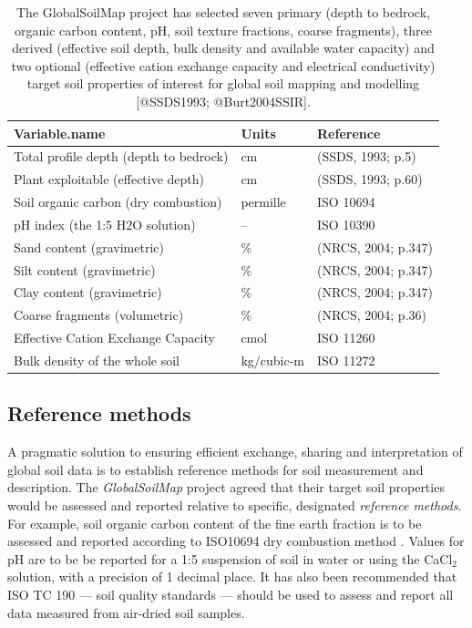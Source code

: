\documentclass[graybox,natbib,nospthms,UStrade]{svmono}
\begin{document}
\begin{table}[t]

\caption{\label{tab:globalsoilmap}The GlobalSoilMap project has selected seven primary (depth to bedrock, organic carbon content, pH, soil texture fractions, coarse fragments), three derived (effective soil depth, bulk density and available water capacity) and two optional (effective cation exchange capacity and electrical conductivity) target soil properties of interest for global soil mapping and modelling [@SSDS1993; @Burt2004SSIR].}
\centering
\begin{tabular}{lll}
\toprule
Variable.name & Units & Reference\\
\midrule
Total profile depth (depth to bedrock) & cm & (SSDS, 1993; p.5)\\
Plant exploitable (effective depth) & cm & (SSDS, 1993; p.60)\\
Soil organic carbon (dry combustion) & permille & ISO 10694\\
pH index (the 1:5 H2O solution) & – & ISO 10390\\
Sand content (gravimetric) & \% & (NRCS, 2004; p.347)\\
\addlinespace
Silt content (gravimetric) & \% & (NRCS, 2004; p.347)\\
Clay content (gravimetric) & \% & (NRCS, 2004; p.347)\\
Coarse fragments (volumetric) & \% & (NRCS, 2004; p.36)\\
Effective Cation Exchange Capacity & cmol & ISO 11260\\
Bulk density of the whole soil & kg/cubic-m & ISO 11272\\
\bottomrule
\end{tabular}
\end{table}

\hypertarget{reference-methods}{%
\subsection{Reference methods}\label{reference-methods}}

A pragmatic solution to ensuring efficient exchange, sharing and interpretation of global soil data
is to establish reference methods for soil measurement and description. The
\emph{GlobalSoilMap} project agreed that their target soil properties would be
assessed and reported relative to specific, designated \emph{reference
methods}. For example, soil organic carbon content of the fine earth
fraction is to be assessed and reported according to ISO10694 dry
combustion method \citep{Sleutel2007CSSPA}. Values for pH are to be be
reported for a 1:5 suspension of soil in water or using the CaCl\(_2\)
solution, with a precision of 1 decimal place. It has also been
recommended that ISO TC 190 --- soil quality standards --- should be used to
assess and report all data measured from air-dried soil samples.
\end{document}
